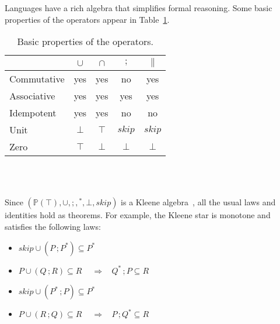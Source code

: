 \documentclass[a4paper,leqno]{llncs}
\newcommand{\spacedwith}[2]{\ensuremath{\phantom{#2}#1\phantom{#2}}}
\newcommand{\spaced}[1]{\spacedwith{#1}{m}}
\newcommand{\aleq}{\ensuremath{\subseteq}}
\newcommand{\askip}{\ensuremath{\textit{skip}}}
\newcommand{\abottom}{\ensuremath{\bot}}
\newcommand{\atopp}{\ensuremath{\top}}
\newcommand{\asemicolon}{\ensuremath{\,;}}
\newcommand{\asemicolontext}{\ensuremath{;}}
\newcommand{\aor}{\ensuremath{\cup}}
\newcommand{\aand}{\ensuremath{\cap}}
\newcommand{\astar}{\ensuremath{\parallel}}
\newcommand{\kleene}[1]{\ensuremath{{#1}^*}}
\newcommand{\simplies}{\spaced{\Rightarrow}}
\newlength{\templength}
\begin{document}
Languages have a rich algebra that simplifies formal reasoning. Some basic properties of the operators appear in Table~\ref{Operators}. 

\begin{table}
\begin{center}
\setlength{\templength}{\tabcolsep}
\setlength{\tabcolsep}{8pt}
\begin{tabular}{l|cccc}
\vrule width 0pt depth 1ex
 & \aor & \aand & \asemicolon & \astar \\
\hline
\vrule width 0pt height 2.5ex
Commutative & yes & yes & no & yes \\
Associative & yes & yes & yes & yes \\
Idempotent & yes & yes & no & no \\
Unit & \abottom & \atopp & \askip & \askip \\
Zero & \atopp & \abottom & \abottom & \abottom
\end{tabular} \\ \textcolor{white}{.}
\caption{Basic properties of the operators.\label{Operators}}
\setlength{\tabcolsep}{\templength}
\end{center}
\end{table}

Since $(\mathbb{P}(\atopp), \aor, \asemicolontext\!, \kleene{}, \abottom, \askip)$ is a Kleene algebra~\cite{kozen94completeness}, all the usual laws and identities hold as theorems. For example, the Kleene star is monotone and satisfies the following laws:
\begin{itemize}
\item $\askip \aor (P \asemicolon \kleene{P})  \aleq  \kleene{P}$
\item	$P \aor (Q \asemicolon R) \aleq R$     \simplies    $\kleene{Q} \asemicolon P \aleq R$
\item	$\askip \aor (\kleene{P} \asemicolon P)  \aleq  \kleene{P}$
\item	$P \aor (R \asemicolon Q) \aleq R$     \simplies    $P \asemicolon \kleene{Q} \aleq R$
\end{itemize}
\end{document}
